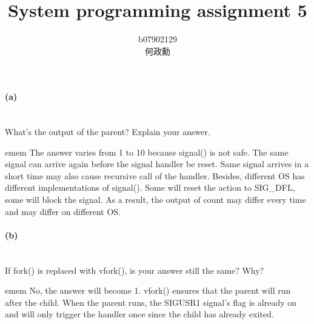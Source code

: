 \documentclass[12pt,a4paper,]{article}
\title{System programming assignment 5}
\author{b07902129 \begin{CJK}{UTF8}{bsmi}何政勳\end{CJK}}
\date{}
\newenvironment{blockquote}[1][1]{%
	\par%
	\medskip
	\leftskip=#1em\rightskip=#1em%
	\noindent\ignorespaces}{%
	\par\medskip}
\begin{document}
\maketitle
{}

\paragraph{(a)}\mbox{}\\
What's the output of the parent? Explain your answer.
	\begin{blockquote}
	The answer varies from 1 to 10 because signal() is not safe. The same signal can arrive again before the signal handler be reset. Same signal arrives in a short time may also cause recursive call of the handler. Besides, different OS has different implementations of signal(). Some will reset the action to SIG\_DFL, some will block the signal. As a result, the output of count may differ every time and may differ on different OS.
	\end{blockquote}


\paragraph{(b)}\mbox{}\\
If fork() is replaced with vfork(), is your answer still the same? Why?
	\begin{blockquote}
	No, the answer will become 1. vfork() ensures that the parent will run after the child. When the parent runs, the SIGUSR1 signal's flag is already on and will only trigger the handler once since the child has already exited.
	\end{blockquote}
\end{document}
